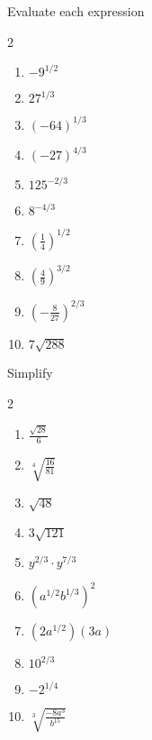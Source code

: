 \documentclass[12pt]{article}
\newenvironment{problem}[2][Problem]{\begin{trivlist}
\item[\hskip \labelsep {\bfseries #1}\hskip \labelsep {\bfseries #2.}]}{\end{trivlist}}
\newenvironment{sol}
    {\emph{Solution:}
    }
    {
    \qed
    }
\begin{document}


\begin{problem}{1}
  Evaluate each expression
\begin{multicols}{2}
  \begin{enumerate}[label=\roman*)]
  \item  $ -9^{1/2}$
  \item $27^{1/3}$
  \item $ (-64)^{1/3}$
  \item $(-27)^{4/3}$
  \item $125^{-2/3}$
  \item $8^{-4/3}$
  \item $ \left(\frac{1}{4}\right)^{1/2}$
  \item $ \left( \frac{4}{9} \right)^{3/2}$
    \item $\left(-\frac{8}{27}\right)^{2/3}$
    \item $7\sqrt{288}$
  \end{enumerate}
\end{multicols}
\end{problem}



\begin{problem}{2}
  Simplify
\begin{multicols}{2}
  \begin{enumerate}[label=\roman*)]
  \item $ \frac{\sqrt{28}}{6}$
  \item $\sqrt[4]{\frac{16}{81}}$
  \item $ \sqrt{48}$
  \item $ 3\sqrt{121} $
  \item $y^{2/3}\cdot y^{7/3}$
  \item $ \left( a^{1/2}b^{1/3}\right)^2$
  \item $ (2a^{1/2})(3a)$
  \item $ 10^{2/3}$
  \item $ -2^{1/4}$
  \item $ \sqrt[3]{\frac{-8a^3}{b^{15}}}$
  \end{enumerate}
\end{multicols}
\end{problem}
\end{document}
